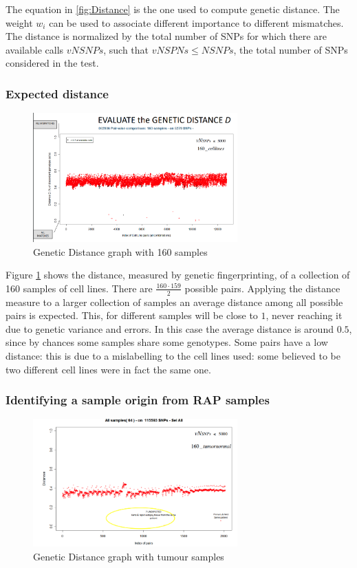 	The equation in \ref{fig:Distance} is the one used to compute genetic distance.
	The weight $w_i$ can be used to associate different importance to different mismatches.
	The distance is normalized by the total number of SNPs for which there are available calls $vNSNPs$, such that $vNSPNs\le NSNPs$, the total number of SNPs considered in the test.

		\subsubsection{Expected distance}

		\begin{figure}[H]
			\centering
			\includegraphics[width=0.7\textwidth]{loci2.PNG}
			\caption{Genetic Distance graph with 160 samples}
			\label{fig:Distance2}
		\end{figure}

		Figure \ref{fig:Distance2} shows the distance, measured by genetic fingerprinting, of a collection of 160 samples of cell lines.
		There are $\frac{160\cdot159}{2}$ possible pairs.
		Applying the distance measure to a larger collection of samples an average distance among all possible pairs is expected.
		This, for different samples will be close to $1$, never reaching it due to genetic variance and errors.
		In this case the average distance is around $0.5$, since by chances some samples share some genotypes.
		Some pairs have a low distance: this is due to a mislabelling to the cell lines used: some believed to be two different cell lines were in fact the same one.

		\subsubsection{Identifying a sample origin from RAP samples}

		\begin{figure}[H]
			\centering
			\includegraphics[width=0.7\textwidth]{loci3.PNG}
			\caption{Genetic Distance graph with tumour samples}
			\label{fig:Distance3}
		\end{figure}

